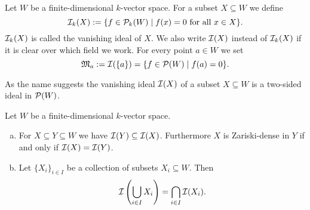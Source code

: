 \begin{defi}
 Let $W$ be a finite-dimensional $k$-vector space. For a subset $X \subseteq W$ we define
 \[
  \mathcal{I}_k(X) := \{ f \in \mathcal{P}_k(W) \mid f(x) = 0 \text{ for all } x \in X \}.
 \]
 $\mathcal{I}_k(X)$ is called the vanishing ideal of $X$. We also write $\mathcal{I}(X)$ instead of $\mathcal{I}_k(X)$ if it is clear over which field we work.
 For every point $a \in W$ we set
 \[
  \mathfrak{M}_a := \mathcal{I}(\{a\}) = \{f \in \mathcal{P}(W) \mid f(a) = 0\}.
 \]
\end{defi}


\begin{rem}
 As the name suggests the vanishing ideal $\mathcal{I}(X)$ of a subset $X \subseteq W$ is a two-sided ideal in $\mathcal{P}(W)$.
\end{rem}


\begin{rem}
 Let $W$ be a finite-dimensional $k$-vector space.
 \begin{enumerate}[a)]
  \item
  For $X \subseteq Y \subseteq W$ we have $\mathcal{I}(Y) \subseteq \mathcal{I}(X)$. Furthermore $X$ is Zariski-dense in $Y$ if and only if $\mathcal{I}(X) = \mathcal{I}(Y)$.
  \item
  Let $\{X_i\}_{i \in I}$ be a collection of subsets $X_i \subseteq W$. Then
  \[
   \mathcal{I}\left( \bigcup_{i \in I} X_i \right) = \bigcap_{i \in I} \mathcal{I}(X_i).
  \]

 \end{enumerate}
\end{rem}


